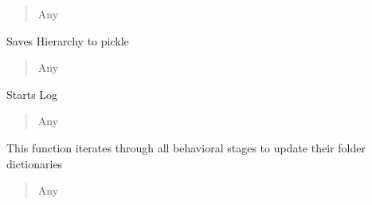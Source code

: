 \documentclass[letterpaper,10pt,english]{sphinxmanual}
\begin{document}
\begin{fulllineitems}
\begin{fulllineitems}
\begin{quote}
\begin{description}
\sphinxAtStartPar
Any

\end{description}\end{quote}

\end{fulllineitems}


\begin{fulllineitems}
\label{\detokenize{ExperimentHierarchy:ExperimentHierarchy.ExperimentData.save_experiments}}
\pysigstartsignatures
{}
\pysigstopsignatures
\sphinxAtStartPar
Saves Hierarchy to pickle
\begin{quote}\begin{description}
\sphinxAtStartPar
Any

\end{description}\end{quote}

\end{fulllineitems}


\begin{fulllineitems}
\label{\detokenize{ExperimentHierarchy:ExperimentHierarchy.ExperimentData.start_log}}
\pysigstartsignatures
{}
\pysigstopsignatures
\sphinxAtStartPar
Starts Log
\begin{quote}\begin{description}
\sphinxAtStartPar
Any

\end{description}\end{quote}

\end{fulllineitems}


\begin{fulllineitems}
\label{\detokenize{ExperimentHierarchy:ExperimentHierarchy.ExperimentData.update_all_folder_dictionaries}}
\pysigstartsignatures
{}
\pysigstopsignatures
\sphinxAtStartPar
This function iterates through all behavioral stages to update their folder dictionaries
\begin{quote}\begin{description}
\sphinxAtStartPar
Any


\end{description}
\end{quote}
\end{fulllineitems}
\end{fulllineitems}
\end{document}
